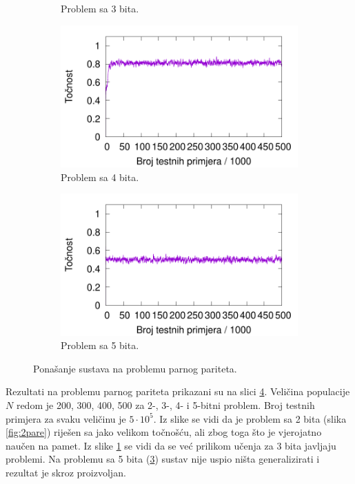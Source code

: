 \documentclass[times, utf8, zavrsni]{fer}
\begin{document}
\begin{figure}
\begin{subfigure}{0.496\textwidth}
        \caption{Problem sa 3 bita.}
        \label{fig:3pare}
    \end{subfigure}
    \begin{subfigure}{0.496\textwidth}
        \centering
        \includegraphics[width=\textwidth]{img/parity/4pare.pdf}
        \caption{Problem sa 4 bita.}
        \label{fig:4pare}
    \end{subfigure}
    \begin{subfigure}{0.496\textwidth}
        \centering
        \includegraphics[width=\textwidth]{img/parity/5pare.pdf}
        \caption{Problem sa 5 bita.}
        \label{fig:5pare}
    \end{subfigure}
    \caption{Ponašanje sustava na problemu parnog pariteta.}
    \label{fig:pare}
\end{figure}
Rezultati na problemu parnog pariteta prikazani su na slici \ref{fig:pare}.
Veličina populacije $N$ redom je 200, 300, 400, 500 za 2-, 3-, 4- i 5-bitni problem.
Broj testnih primjera za svaku veličinu je $5 \cdot 10^{5}$.
Iz slike se vidi da je problem sa 2 bita (slika \ref{fig:2pare}) riješen sa jako velikom točnošću, ali zbog toga što je vjerojatno naučen na pamet.
Iz slike \ref{fig:3pare} se vidi da se već prilikom učenja za 3 bita javljaju problemi.
Na problemu sa 5 bita (\ref{fig:5pare}) sustav nije uspio ništa generalizirati i rezultat je skroz proizvoljan.
\end{document}
